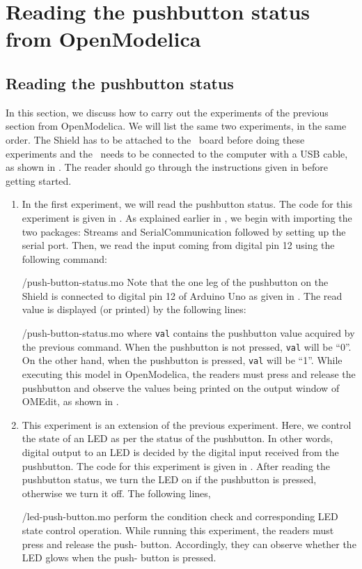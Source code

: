 \section{Reading the pushbutton status from OpenModelica}
\subsection{Reading the pushbutton status}
In this section, we discuss how to carry out the experiments of the
previous section from OpenModelica.  We will list the same two experiments,
in the same order.  The Shield has to be attached to the \arduino\ board
before doing these experiments and the \arduino\ needs to be connected to the computer 
with a USB cable, as shown in .
The reader should go through the instructions given in
 before getting started.

\begin{enumerate}
\item In the first experiment, we will read the pushbutton status. The code for this experiment is given in
  . As explained earlier in , 
  we begin with importing the two packages: Streams and SerialCommunication followed 
  by setting up the serial port. Then, we read the input coming
 from digital pin 12 using the following command: 
 
  {\LocPushOpenModelicacode/push-button-status.mo}
  Note that the one leg of the pushbutton on the Shield is connected to digital
pin 12 of Arduino Uno as given in . The read value is displayed (or
printed) by the following lines:

  {\LocPushOpenModelicacode/push-button-status.mo} where {\tt val} contains the pushbutton value acquired by the previous command.
  When the pushbutton is not pressed, {\tt val} will be ``0''. On the other hand,
  when the pushbutton is pressed, {\tt val} will be ``1''. While executing this model in OpenModelica, 
the readers must press and release the pushbutton and observe the values being printed
on the output window of OMEdit, as shown in .
\item This experiment is an extension of the previous
  experiment. Here, we control the state of an LED as per the status
  of the pushbutton. In other words, digital output to an LED is
  decided by the digital input received from the pushbutton. The code
  for this experiment is given in . 
  After reading the pushbutton status, we turn the LED on if the pushbutton is
  pressed, otherwise we turn it off. The following lines, 
  
  {\LocPushOpenModelicacode/led-push-button.mo} perform the condition check
  and corresponding LED state control operation. While running this experiment, the readers must press and release the push-
  button. Accordingly, they can observe whether the LED glows when the push-
  button is pressed.
\end{enumerate}

